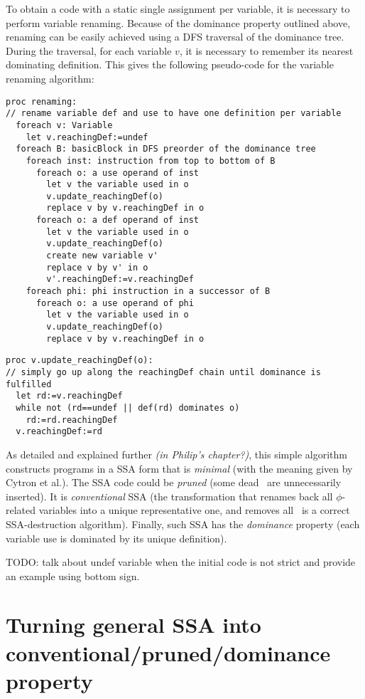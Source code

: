 {To obtain a code with a static single assignment per variable, it is necessary to perform variable renaming. Because of the dominance property outlined above,
renaming can be easily achieved using a DFS traversal of the dominance tree.
During the traversal, for each variable $v$, it is necessary to remember its nearest dominating definition.
This gives the following pseudo-code for the variable renaming algorithm:
\begin{verbatim}
proc renaming:
// rename variable def and use to have one definition per variable
  foreach v: Variable
    let v.reachingDef:=undef
  foreach B: basicBlock in DFS preorder of the dominance tree
    foreach inst: instruction from top to bottom of B
      foreach o: a use operand of inst
        let v the variable used in o
        v.update_reachingDef(o)
        replace v by v.reachingDef in o
      foreach o: a def operand of inst
        let v the variable used in o
        v.update_reachingDef(o)
        create new variable v'
        replace v by v' in o
        v'.reachingDef:=v.reachingDef
    foreach phi: phi instruction in a successor of B
      foreach o: a use operand of phi
        let v the variable used in o
        v.update_reachingDef(o)
        replace v by v.reachingDef in o
\end{verbatim}

\begin{verbatim}
proc v.update_reachingDef(o):
// simply go up along the reachingDef chain until dominance is fulfilled 
  let rd:=v.reachingDef
  while not (rd==undef || def(rd) dominates o)
    rd:=rd.reachingDef
  v.reachingDef:=rd
\end{verbatim}

As detailed and explained further \emph{(in Philip's chapter?)}, this simple algorithm constructs programs in a SSA form that is \textit{minimal} (with the meaning given by Cytron et al.).
The SSA code could be \textit{pruned} (some dead \phiops\ are unnecessarily inserted).
It is \textit{conventional} SSA (the transformation that renames back all $\phi$-related variables into a unique representative one, and removes all \phiops\ is a correct SSA-destruction algorithm).
Finally, such SSA has the \textit{dominance} property (each variable use is dominated by its unique definition).

TODO: talk about undef variable when the initial code is not strict and provide an example using bottom sign.

\section{Turning general SSA into conventional/pruned/dominance property}

}
